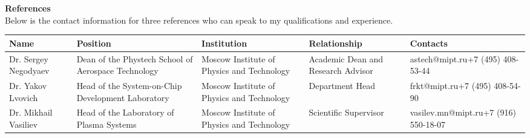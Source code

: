 \documentclass[a4paper,12pt]{article}
\begin{document}
\noindent \textbf{References}\\
Below is the contact information for three references who can speak to my qualifications and experience.
\vspace{-20pt}
\begin{table}[htbp]
  \centering
  \small
  \renewcommand{\arraystretch}{1.5}
  \begin{tabularx}{\textwidth}{@{}>{\centering\arraybackslash}X>{\centering\arraybackslash}X>{\centering\arraybackslash}X>{\centering\arraybackslash}X>{\centering\arraybackslash}X@{}}
    \toprule
    \textbf{Name} & \textbf{Position} & \textbf{Institution} & \textbf{Relationship} & \textbf{Contacts} \\
    \midrule
    Dr. Sergey Negodyaev & Dean of the Phystech School of Aerospace Technology & Moscow Institute of Physics and Technology & Academic Dean and Research Advisor & astech@mipt.ru\newline +7 (495) 408-53-44 \\
    \midrule
    Dr. Yakov Lvovich & Head of the System-on-Chip Development Laboratory & Moscow Institute of Physics and Technology & Department Head & frkt@mipt.ru\newline +7 (495) 408-54-90 \\
    \midrule
    Dr. Mikhail Vasiliev & Head of the Laboratory of Plasma Systems & Moscow Institute of Physics and Technology & Scientific Supervisor & vasilev.mn@mipt.ru\newline +7 (916) 550-18-07 \\
    \bottomrule
  \end{tabularx}
\end{table}
\end{document}
